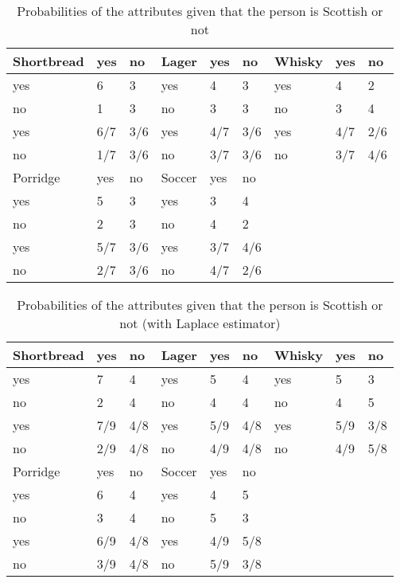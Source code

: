 \documentclass[fontsize=12pt, usenames, dvipsnames, headinclude, headsepline, footinclude, footsepline]{scrartcl}
\begin{document}
\begin{table}[]
\centering
\caption{Probabilities of the attributes given that the person is Scottish or not}
\begin{tabular}{@{}lll|lll|lll@{}}
\toprule
Shortbread & yes & no  & Lager  & yes & no  & Whisky & yes & no  \\ \midrule
yes        & 6   & 3   & yes    & 4   & 3   & yes    & 4   & 2   \\
no         & 1   & 3   & no     & 3   & 3   & no     & 3   & 4   \\
yes        & 6/7 & 3/6 & yes    & 4/7 & 3/6 & yes    & 4/7 & 2/6 \\
no         & 1/7 & 3/6 & no     & 3/7 & 3/6 & no     & 3/7 & 4/6 \\ \midrule
Porridge   & yes & no  & Soccer & yes & no  &        &     &     \\ \cmidrule(r){1-6}
yes        & 5   & 3   & yes    & 3   & 4   &        &     &     \\
no         & 2   & 3   & no     & 4   & 2   &        &     &     \\
yes        & 5/7 & 3/6 & yes    & 3/7 & 4/6 &        &     &     \\
no         & 2/7 & 3/6 & no     & 4/7 & 2/6 &        &     &     \\ \bottomrule
\end{tabular}
\end{table}


\begin{table}[]
\centering
\caption{Probabilities of the attributes given that the person is Scottish or not (with Laplace estimator)}
\begin{tabular}{@{}lll|lll|lll@{}}
\toprule
Shortbread & yes & no  & Lager  & yes & no  & Whisky & yes & no  \\ \midrule
yes        & 7   & 4   & yes    & 5   & 4   & yes    & 5   & 3   \\
no         & 2   & 4   & no     & 4   & 4   & no     & 4   & 5   \\
yes        & 7/9 & 4/8 & yes    & 5/9 & 4/8 & yes    & 5/9 & 3/8 \\
no         & 2/9 & 4/8 & no     & 4/9 & 4/8 & no     & 4/9 & 5/8 \\ \midrule
Porridge   & yes & no  & Soccer & yes & no  &        &     &     \\ \cmidrule(r){1-6}
yes        & 6   & 4   & yes    & 4   & 5   &        &     &     \\
no         & 3   & 4   & no     & 5   & 3   &        &     &     \\
yes        & 6/9 & 4/8 & yes    & 4/9 & 5/8 &        &     &     \\
no         & 3/9 & 4/8 & no     & 5/9 & 3/8 &        &     &     \\ \bottomrule
\end{tabular}
\end{table}


	
\end{document}
